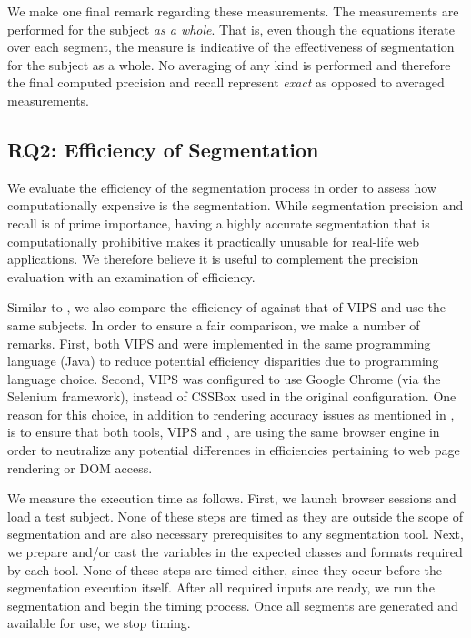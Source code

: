 

We make one final remark regarding these measurements.
The measurements are performed for the subject \emph{as a whole}.
That is, even though the equations iterate over each segment,
the measure is indicative of the effectiveness
of segmentation for the subject as a whole.
No averaging of any kind is performed
and therefore the final computed precision and recall
represent \emph{exact} as opposed to averaged measurements.

\subsection{RQ2: Efficiency of Segmentation}
We evaluate the efficiency of the segmentation process in order to assess
how computationally expensive is the segmentation.
While segmentation precision and recall is of prime importance,
having a highly accurate segmentation
that is computationally prohibitive makes it practically unusable for real-life web applications.
We therefore believe it is useful to complement the precision evaluation with
an examination of efficiency.

Similar to ,
we also compare the efficiency of \toolname against
that of VIPS and use the same subjects.
In order to ensure a fair comparison, we make a number of remarks.
First, both VIPS and \toolname
were implemented in the same programming language (Java)
to reduce potential efficiency disparities due to programming language choice.
Second, VIPS was configured 
to use Google Chrome (via the Selenium framework),
instead of CSSBox used in the original configuration.
One reason for this choice,
in addition to rendering accuracy issues as mentioned in ,
is to ensure that both tools, VIPS and \toolname,
are using the same browser engine in order to neutralize any potential
differences in efficiencies pertaining to web page rendering or DOM access.

We measure the execution time as follows.
First, we launch browser sessions and load a test subject.
None of these steps are timed as they are outside the scope of segmentation 
and are also necessary prerequisites to any segmentation tool.
Next, we prepare and/or cast the variables in the expected classes and formats
required by each tool. None of these steps are timed either, since they
occur before the segmentation execution itself.
After all required inputs are ready, we run the segmentation and begin the timing process.
Once all segments are generated and available for use, we stop timing.





